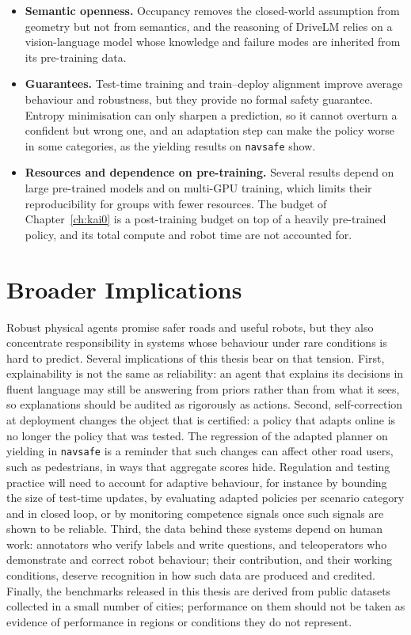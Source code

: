 \begin{itemize}[leftmargin=*, itemsep=3pt]
  \item \textbf{Semantic openness.} Occupancy removes the closed-world assumption from geometry but not from semantics, and the reasoning of DriveLM relies on a vision-language model whose knowledge and failure modes are inherited from its pre-training data.
  \item \textbf{Guarantees.} Test-time training and train--deploy alignment improve average behaviour and robustness, but they provide no formal safety guarantee. Entropy minimisation can only sharpen a prediction, so it cannot overturn a confident but wrong one, and an adaptation step can make the policy worse in some categories, as the yielding results on \texttt{navsafe} show.
  \item \textbf{Resources and dependence on pre-training.} Several results depend on large pre-trained models and on multi-GPU training, which limits their reproducibility for groups with fewer resources. The budget of Chapter~\ref{ch:kai0} is a post-training budget on top of a heavily pre-trained policy, and its total compute and robot time are not accounted for.
\end{itemize}

\section{Broader Implications}\label{sec:disc:ethics}

Robust physical agents promise safer roads and useful robots, but they also concentrate responsibility in systems whose behaviour under rare conditions is hard to predict. Several implications of this thesis bear on that tension. First, explainability is not the same as reliability: an agent that explains its decisions in fluent language may still be answering from priors rather than from what it sees, so explanations should be audited as rigorously as actions. Second, self-correction at deployment changes the object that is certified: a policy that adapts online is no longer the policy that was tested. The regression of the adapted planner on yielding in \texttt{navsafe} is a reminder that such changes can affect other road users, such as pedestrians, in ways that aggregate scores hide. Regulation and testing practice will need to account for adaptive behaviour, for instance by bounding the size of test-time updates, by evaluating adapted policies per scenario category and in closed loop, or by monitoring competence signals once such signals are shown to be reliable. Third, the data behind these systems depend on human work: annotators who verify labels and write questions, and teleoperators who demonstrate and correct robot behaviour; their contribution, and their working conditions, deserve recognition in how such data are produced and credited. Finally, the benchmarks released in this thesis are derived from public datasets collected in a small number of cities; performance on them should not be taken as evidence of performance in regions or conditions they do not represent.
